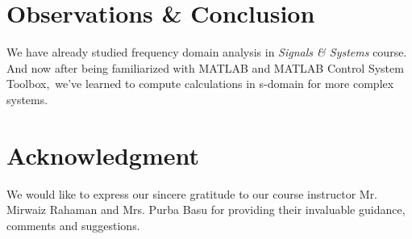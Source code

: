 \documentclass[12pt,conference,a4paper,twocolumn]{IEEEtran}
\begin{document}
\section{Observations \& Conclusion}
We have already studied frequency domain analysis in \textit{Signals \& Systems} course. And now after being familiarized with MATLAB and MATLAB Control System Toolbox,\
we've learned to compute calculations in s-domain for more complex systems.

\section{Acknowledgment}
We would like to express our sincere gratitude to our course instructor Mr. Mirwaiz Rahaman and Mrs. Purba Basu for providing their invaluable guidance, comments and suggestions.
\end{document}
